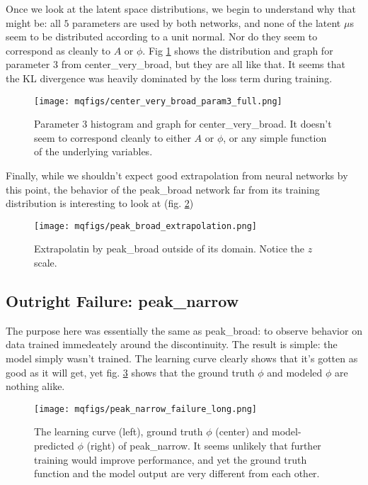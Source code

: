 \documentclass[aps,prl,preprint,groupedaddress]{revtex4-1}
\begin{document}
Once we look at the latent space distributions, we begin to understand why that might be: all $5$ parameters are used by both networks, and none of the latent $\mu$s seem to be distributed according to a unit normal. Nor do they seem to correspond as cleanly to $A$ or $\phi$. Fig \ref{centerParam3} shows the distribution and graph for parameter $3$ from center\_very\_broad, but they are all like that. It seems that the KL divergence was heavily dominated by the loss term during training.

\begin{figure}[h]
   \centering
   \texttt{[image: mqfigs/center\_very\_broad\_param3\_full.png]}
   \caption{\label{centerParam3} Parameter 3 histogram and graph for center\_very\_broad. It doesn't seem to correspond cleanly to either $A$ or $\phi$, or any simple function of the underlying variables.}
\end{figure}

Finally, while we shouldn't expect good extrapolation from neural networks by this point, the behavior of the peak\_broad network far from its training distribution is interesting to look at (fig. \ref{peakBroadExtrapolation})

\begin{figure}[h]
   \centering
   \texttt{[image: mqfigs/peak\_broad\_extrapolation.png]}
   \caption{\label{peakBroadExtrapolation} Extrapolatin by peak\_broad outside of its domain. Notice the $z$ scale.}
\end{figure}

\subsection{ Outright Failure: peak\_narrow}

The purpose here was essentially the same as peak\_broad: to observe behavior on data trained immedeately around the discontinuity. The result is simple: the model simply wasn't trained. The learning curve clearly shows that it's gotten as good as it will get, yet fig. \ref{peakNarrowFailure} shows that the ground truth $\phi$ and modeled $\phi$ are nothing alike.

\begin{figure}[h]
   \centering
   \texttt{[image: mqfigs/peak\_narrow\_failure\_long.png]}
   \caption{\label{peakNarrowFailure} The learning curve (left), ground truth $\phi$ (center) and model-predicted $\phi$ (right) of peak\_narrow. It seems unlikely that further training would improve performance, and yet the ground truth function and the model output are very different from each other.}
\end{figure}
\end{document}
